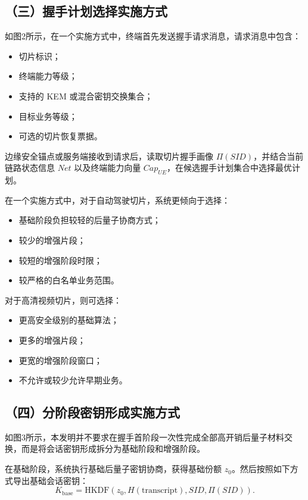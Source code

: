 \documentclass[12pt,a4paper]{article}
\newcommand{\Kbase}{K_{\mathrm{base}}}
\begin{document}
\subsection*{（三）握手计划选择实施方式}

如图2所示，在一个实施方式中，终端首先发送握手请求消息，请求消息中包含：

\begin{itemize}[leftmargin=2em]
    \item 切片标识；
    \item 终端能力等级；
    \item 支持的 KEM 或混合密钥交换集合；
    \item 目标业务等级；
    \item 可选的切片恢复票据。
\end{itemize}

边缘安全锚点或服务端接收到请求后，读取切片握手画像 $\Pi(SID)$，并结合当前链路状态信息 $Net$ 以及终端能力向量 $Cap_{UE}$，在候选握手计划集合中选择最优计划。

在一个实施方式中，对于自动驾驶切片，系统更倾向于选择：

\begin{itemize}[leftmargin=2em]
    \item 基础阶段负担较轻的后量子协商方式；
    \item 较少的增强片段；
    \item 较短的增强阶段时限；
    \item 较严格的白名单业务范围。
\end{itemize}

对于高清视频切片，则可选择：

\begin{itemize}[leftmargin=2em]
    \item 更高安全级别的基础算法；
    \item 更多的增强片段；
    \item 更宽的增强阶段窗口；
    \item 不允许或较少允许早期业务。
\end{itemize}

\subsection*{（四）分阶段密钥形成实施方式}

如图3所示，本发明并不要求在握手首阶段一次性完成全部高开销后量子材料交换，而是将会话密钥形成拆分为基础阶段和增强阶段。

在基础阶段，系统执行基础后量子密钥协商，获得基础份额 $z_0$。然后按照如下方式导出基础会话密钥：
\[
\Kbase=\mathrm{HKDF}(z_0, H(\mathrm{transcript}), SID, \Pi(SID)).
\]
\end{document}
